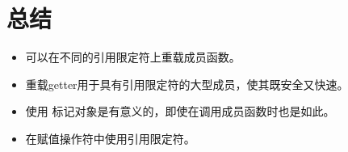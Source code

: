 \section{总结}
\begin{itemize}
	\item 可以在不同的引用限定符上重载成员函数。
	\item 重载getter用于具有引用限定符的大型成员，使其既安全又快速。
	\item 使用  标记对象是有意义的，即使在调用成员函数时也是如此。
	\item 在赋值操作符中使用引用限定符。
\end{itemize}


